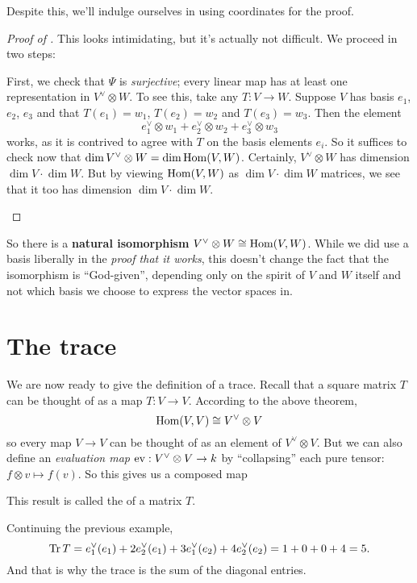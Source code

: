 Despite this, we'll indulge ourselves in using coordinates for the proof.
\begin{proof}
	[Proof of ]
	This looks intimidating, but it's actually not difficult.
	We proceed in two steps:
	\begin{enumerate}
		\ii First, we check that $\Psi$ is \emph{surjective};
		every linear map has at least one representation in $V^\vee \otimes W$.
		To see this, take any $T : V \to W$.
		Suppose $V$ has basis $e_1$, $e_2$, $e_3$ and that
		$T(e_1) = w_1$, $T(e_2) = w_2$ and $T(e_3) = w_3$.
		Then the element
		\[ e_1^\vee \otimes w_1 + e_2^\vee \otimes w_2 + e_3^\vee \otimes w_3 \]
		works, as it is contrived to agree with $T$ on the basis elements $e_i$.
		\ii So it suffices to check now that $\dim V^\vee \otimes W = \dim \operatorname{Hom}(V,W)$.
		Certainly, $V^\vee \otimes W$ has dimension $\dim V \cdot \dim W$.
		But by viewing $\operatorname{Hom}(V,W)$ as $\dim V \cdot \dim W$ matrices, we see that
		it too has dimension $\dim V \cdot \dim W$. \qedhere
	\end{enumerate}
\end{proof}
So there is a \textbf{natural isomorphism} $V^\vee \otimes W \cong \operatorname{Hom}(V,W)$.
While we did use a basis liberally in the
\emph{proof that it works}, this doesn't change the
fact that the isomorphism is ``God-given'',
depending only on the spirit of $V$ and $W$ itself
and not which basis we choose to express the vector spaces in.


\section{The trace}
We are now ready to give the definition of a trace.
Recall that a square matrix $T$ can be thought of as a map $T \colon V \to V$.
According to the above theorem,
\[ \operatorname{Hom}(V, V) \cong V^\vee \otimes V \]
so every map $V \to V$ can be thought of as an element of $V^\vee \otimes V$.
But we can also define an
\emph{evaluation map} $\operatorname{ev} : V^\vee \otimes V \to k$
by ``collapsing'' each pure tensor: $f \otimes v \mapsto f(v)$.
So this gives us a composed map
\begin{center}
\end{center}
This result is called the  of a matrix $T$.

\begin{example}
	Continuing the previous example,
	\[ \operatorname{Tr} T = e_1^\vee(e_1) + 2e_2^\vee(e_1) 
		+ 3e_1^\vee(e_2) + 4e_2^\vee(e_2)
		= 1 + 0 + 0 + 4 = 5. \]
	And that is why the trace is the sum of the diagonal entries.
\end{example}

